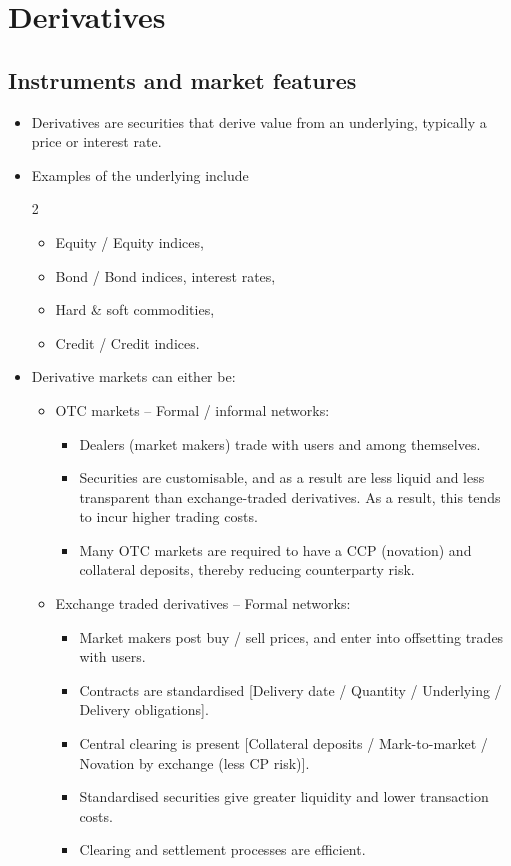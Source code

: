 \documentclass[../notes_compiled.tex]{subfiles}
\begin{document}
\section{Derivatives}

\subsection{Instruments and market features}
\begin{itemize}
\item Derivatives are securities that derive value from an underlying, typically a price or interest rate.
\item Examples of the underlying include
\begin{multicols}{2}
\begin{itemize} 
\item  Equity / Equity indices,
\item Bond / Bond indices, interest rates,
\item Hard \& soft commodities,
\item Credit / Credit indices.
\end{itemize}
\end{multicols}
\item Derivative markets can either be:
\begin{itemize}
\item OTC markets -- Formal / informal networks:
\begin{itemize}
\item Dealers (market makers) trade with users and among themselves.
\item Securities are customisable, and as a result are less liquid and less transparent than exchange-traded derivatives. As a result, this tends to incur higher trading costs.
\item Many OTC markets are required to have a CCP (novation) and collateral deposits, thereby reducing counterparty risk.
\end{itemize}
\item Exchange traded derivatives -- Formal networks:
\begin{itemize}
\item Market makers post buy / sell prices, and enter into offsetting trades with users.
\item Contracts are standardised [Delivery date / Quantity / Underlying / Delivery obligations].
\item Central clearing is present [Collateral deposits / Mark-to-market / Novation by exchange (less CP risk)].
\item Standardised securities give greater liquidity and lower transaction costs.
\item Clearing and settlement processes are efficient.
\end{itemize}
\end{itemize}


\end{itemize}
\end{document}
